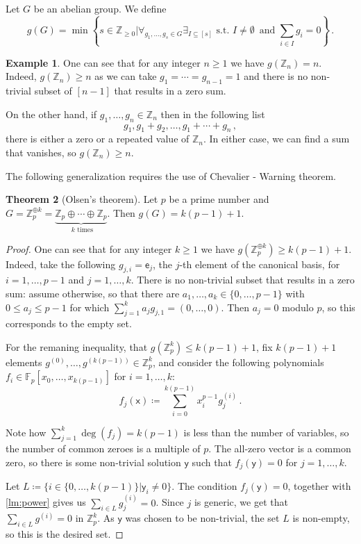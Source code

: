 \documentclass[12pt]{amsart}
\theoremstyle{definition}
\newtheorem{thm}{Theorem}[section]
\newtheorem{smpl}[thm]{Example}
\newcommand{\Z}{\mathbb{Z}}
\newcommand{\F}{\mathbb{F}}
\newcommand{\vx}{\mathsf{x}}
\newcommand{\vy}{\mathsf{y}}
\newcommand{\ve}{\mathsf{e}}
\begin{document}
Let $G$ be an abelian group.
We define 
$$g(G) = \min \left\{ s \in \Z_{\geq 0} \Big| \forall_{g_1, \ldots, g_s \in G} \exists_{I \subseteq [s]} \text{ s.t. } I \neq \emptyset \, \text{ and } \sum_{i \in I} g_i = 0 \right\}\, . $$

\begin{smpl}
One can see that for any integer $n \geq 1 $ we have $g(\Z_n) = n$.
Indeed, $g(\Z_n ) \geq n$ as we can take $g_1 = \cdots = g_{n-1} = 1$ and there is no non-trivial subset of $[n-1]$ that results in a zero sum.

On the other hand, if $g_1, \ldots, g_n \in \Z_n $ then in the following list
$$ g_1, g_1 + g_2, \ldots, g_1 + \cdots + g_n \, , $$
there is either a zero or a repeated value of $\Z_n$.
In either case, we can find a sum that vanishes, so $g(\Z_n) \geq n$.
\end{smpl}

The following generalization requires the use of Chevalier - Warning theorem.

\begin{thm}[Olsen's theorem]
Let $p$ be a prime number and $G = \Z_p^{\oplus k} = \underbrace{\Z_p \oplus \cdots \oplus \Z_p}_{\text{ $k$ times } }$.
Then $g(G) = k(p-1)+ 1$.
\end{thm}

\begin{proof}
One can see that for any integer $k \geq 1 $ we have $g(\Z_p^{\oplus k}) \geq k(p-1)+1$.
Indeed, take the following  $g_{j, i} = \ve_j$, the $j$-th element of the canonical basis, for $i=1, \ldots, p-1$ and $j=1, \ldots, k$.
There is no non-trivial subset that results in a zero sum:
assume otherwise, so that there are $a_1, \ldots, a_k \in \{0, \ldots, p-1\}$ with $0 \leq a_j \leq p-1$ for which $\sum_{j=1}^k a_j g_{j, 1} = (0, \ldots,  0) $.
Then $a_j = 0$ modulo $p$, so this corresponds to the empty set.

For the remaning inequality, that $g(\Z_p^k) \leq k(p-1)+1$, fix $k(p-1)+1$ elements $g^{(0)}, \ldots, g^{(k(p-1))} \in \Z_p^k$, and consider the following polynomials $f_i \in \F_p[x_0, \ldots, x_{k(p-1)}]$ for $i = 1, \ldots, k$:
$$f_j(\vx ) \coloneqq \sum_{i=0}^{k(p-1)} x_i^{p-1}g^{(i)}_j \, .$$

Note how $\sum_{j=1}^ k \deg(f_j) = k(p-1)$ is less than the number of variables, so the number of common zeroes is a multiple of $p$.
The all-zero vector is a common zero, so there is some non-trivial solution $\vy$ such that $f_j(\vy) = 0$ for $j=1, \ldots, k$.

Let $L \coloneqq \{ i\in\{0, \ldots, k(p-1)\} | \vy_i \neq 0 \}$.
The condition $f_j(\vy) = 0$, together with \cref{lm:power} gives us $\sum_{i\in L} g^{(i)}_j = 0$.
Since $j$ is generic, we get that $\sum_{i\in L} g^{(i)} = 0$ in $\Z_p^k$.
As $\vy $ was chosen to be non-trivial, the set $L$ is non-empty, so this is the desired set.
\end{proof}
\end{document}
